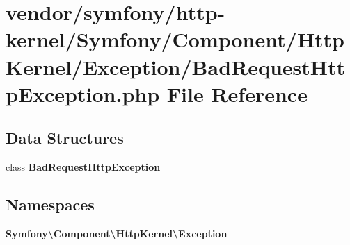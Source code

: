 \section{vendor/symfony/http-\/kernel/\+Symfony/\+Component/\+Http\+Kernel/\+Exception/\+Bad\+Request\+Http\+Exception.php File Reference}
\label{_bad_request_http_exception_8php}
\subsection*{Data Structures}
\begin{DoxyCompactItemize}
\item 
class {\bf Bad\+Request\+Http\+Exception}
\end{DoxyCompactItemize}
\subsection*{Namespaces}
\begin{DoxyCompactItemize}
\item 
 {\bf Symfony\textbackslash{}\+Component\textbackslash{}\+Http\+Kernel\textbackslash{}\+Exception}
\end{DoxyCompactItemize}
